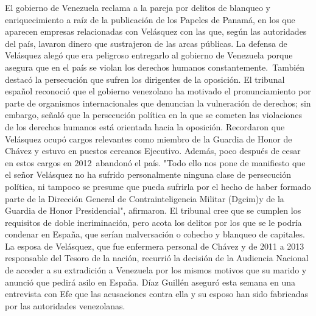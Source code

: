 \documentclass{article}%
\begin{document}
%
El gobierno de Venezuela reclama a la pareja por delitos de blanqueo y enriquecimiento a raíz de la publicación de los Papeles de Panamá, en los que aparecen empresas relacionadas con Velásquez con las que, según las autoridades del país, lavaron dinero que sustrajeron de las arcas públicas.%
\newline%
%
La defensa de Velásquez alegó que era peligroso entregarlo al gobierno de Venezuela porque asegura que en el país se violan los derechos humanos constantemente.~También destacó la persecución que sufren los dirigentes de la oposición.%
\newline%
%
El tribunal español reconoció que el gobierno venezolano ha motivado el pronunciamiento por parte de organismos internacionales que denuncian la vulneración de derechos; sin embargo, señaló que la persecución política en la que se cometen las violaciones de los derechos humanos está orientada hacia la oposición.%
\newline%
%
Recordaron que Velásquez ocupó cargos relevantes como miembro de la Guardia de Honor de Chávez y estuvo en puestos cercanos Ejecutivo. Además, poco después de cesar en estos cargos en 2012~abandonó el país.%
\newline%
%
"Todo ello nos pone de manifiesto que el señor Velásquez no ha sufrido personalmente ninguna clase de persecución política, ni tampoco se presume que pueda sufrirla por el hecho de haber formado parte de la Dirección General de Contrainteligencia Militar (Dgcim)y de la Guardia de Honor Presidencial", afirmaron.%
\newline%
%
El tribunal cree que se cumplen los requisitos de doble incriminación, pero acota los delitos por los que se le podría condenar en España, que serían malversación o cohecho y blanqueo de capitales.%
\newline%
%
La esposa de Velásquez, que fue enfermera personal de Chávez y de 2011 a 2013 responsable del Tesoro de la nación, recurrió la decisión de la Audiencia Nacional de acceder a su extradición a Venezuela por los mismos motivos que su marido y anunció que pedirá asilo en España.%
\newline%
%
Díaz Guillén aseguró esta semana en una entrevista con Efe que las acusaciones contra ella y su esposo han sido fabricadas por las autoridades venezolanas.%
\newline%
%
\end{document}
